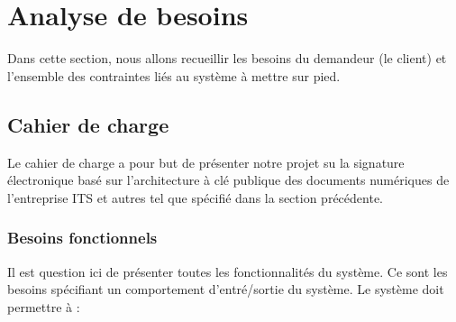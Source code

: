	\section{Analyse de besoins }
		Dans cette section, nous allons recueillir les besoins du demandeur (le client) et l'ensemble des contraintes liés au système à mettre sur pied.
		\subsection{Cahier de charge}
			Le cahier de charge a pour but de présenter notre projet su la signature électronique basé sur l'architecture à clé publique des documents numériques de l'entreprise ITS et autres tel que spécifié dans la section précédente.
		\subsubsection{Besoins fonctionnels}
			Il est question ici de présenter toutes les fonctionnalités du système. Ce sont les besoins spécifiant un comportement d'entré/sortie du système. Le système doit permettre à :
